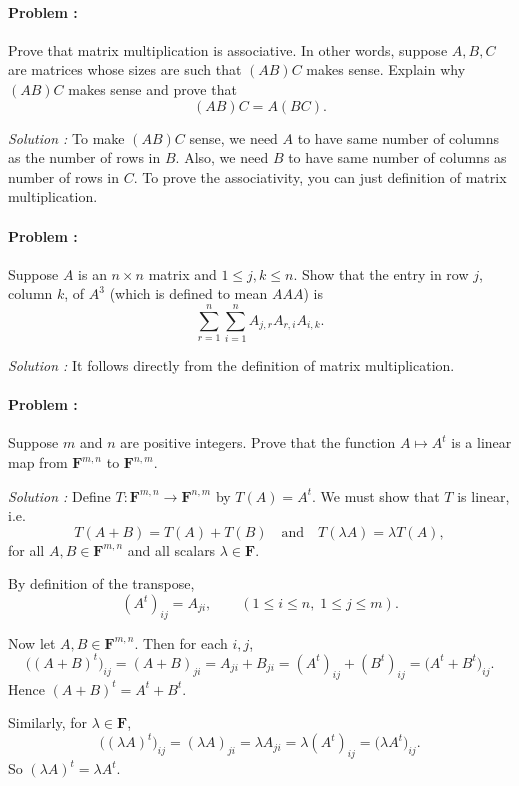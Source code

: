 \paragraph{Problem :}
Prove that matrix multiplication is associative. In other words, suppose \(A, B, C\) are matrices whose sizes are such that \((AB)C\) makes 
sense. Explain why \((AB)C\) makes sense and prove that
\[
(AB)C = A(BC).
\]

\vspace{4mm}
\textit{Solution :} To make $(AB)C$ sense, we need $A$ to have same number of columns as the number of rows in $B$. Also, we need $B$ to 
have same number of columns as number of rows in $C$. To prove the associativity, you can just definition of matrix multiplication.

\paragraph{Problem :}
Suppose \(A\) is an \(n \times n\) matrix and \(1 \leq j, k \leq n\). Show that the entry in row \(j\), column \(k\), of \(A^3\) (which is 
defined to mean \(AAA\)) is
\[
\sum_{r=1}^n \sum_{i=1}^n A_{j,r} A_{r,i} A_{i,k}.
\]

\vspace{4mm}
\textit{Solution :} It follows directly from the definition of matrix multiplication.

\paragraph{Problem :}
Suppose \(m\) and \(n\) are positive integers. Prove that the function \(A \mapsto A^t\) is a linear map from 
\(\mathbf{F}^{m,n}\) to \(\mathbf{F}^{n,m}\).

\vspace{4mm}
\textit{Solution :}
Define \(T : \mathbf{F}^{m,n} \to \mathbf{F}^{n,m}\) by \(T(A) = A^t\).  
We must show that \(T\) is linear, i.e.
\[
T(A+B) = T(A) + T(B) \quad \text{and} \quad 
T(\lambda A) = \lambda T(A),
\]
for all \(A,B \in \mathbf{F}^{m,n}\) and all scalars \(\lambda \in \mathbf{F}\).

By definition of the transpose,
\[
(A^t)_{ij} = A_{ji}, \qquad (1 \leq i \leq n, \; 1 \leq j \leq m).
\]

Now let \(A,B \in \mathbf{F}^{m,n}\). Then for each \(i,j\),
\[
\big((A+B)^t\big)_{ij} = (A+B)_{ji} = A_{ji} + B_{ji} 
= (A^t)_{ij} + (B^t)_{ij} = \big(A^t + B^t\big)_{ij}.
\]
Hence \((A+B)^t = A^t + B^t\).

Similarly, for \(\lambda \in \mathbf{F}\),
\[
\big((\lambda A)^t\big)_{ij} = (\lambda A)_{ji} 
= \lambda A_{ji} = \lambda (A^t)_{ij} 
= \big(\lambda A^t\big)_{ij}.
\]
So \((\lambda A)^t = \lambda A^t\).

